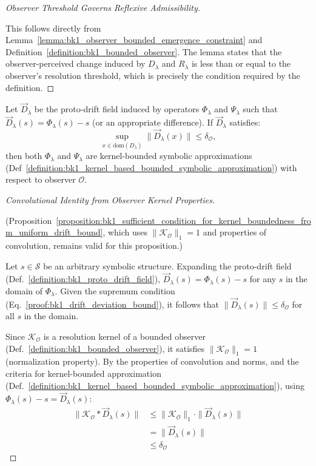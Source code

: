 \begin{proof}[Observer Threshold Governs Reflexive Admissibility]
\label{proof:bk1_observer_threshold_reflexivity}
\leavevmode

This follows directly from Lemma~\ref{lemma:bk1_observer_bounded_emergence_constraint} and Definition~\ref{definition:bk1_bounded_observer}. The lemma states that the observer-perceived change induced by $D_\lambda$ and $R_\lambda$ is less than or equal to the observer's resolution threshold, which is precisely the condition required by the definition.
\end{proof}
\begin{proposition} 
\label{proposition:bk1_sufficient_condition_for_kernel_boundedness_from_uniform_drift_bound}
Let $\vec{D}_\lambda$ be the proto-drift field induced by operators $\Phi_\lambda$ and $\Psi_\lambda$ such that $\vec{D}_\lambda(s) = \Phi_\lambda(s) - s$ (or an appropriate difference). If $\vec{D}_\lambda$ satisfies:
\begin{equation}
\sup_{x \in \mathrm{dom}(D_\lambda)} \|\vec{D}_\lambda(x)\| \leq \delta_\mathcal{O}, 
\end{equation}
then both $\Phi_\lambda$ and $\Psi_\lambda$ are kernel-bounded symbolic approximations (Def~\ref{definition:bk1_kernel_based_bounded_symbolic_approximation}) with respect to observer $\mathcal{O}$.
\begin{proof}[Convolutional Identity from Observer Kernel Properties]
\label{proof:bk1_observer_kernel_convolution}
\leavevmode

(Proposition~\ref{proposition:bk1_sufficient_condition_for_kernel_boundedness_from_uniform_drift_bound}, which uses $\|\mathcal{K}_\mathcal{O}\|_1 = 1$ and properties of convolution, remains valid for this proposition.)

Let $s \in \mathcal{S}$ be an arbitrary symbolic structure. Expanding the proto-drift field (Def.~\ref{definition:bk1_proto_drift_field}), $\vec{D}_\lambda(s) = \Phi_\lambda(s) - s$ for any $s$ in the domain of $\Phi_\lambda$. Given the supremum condition (Eq.~\ref{proof:bk1_drift_deviation_bound}), it follows that $\|\vec{D}_\lambda(s)\| \leq \delta_\mathcal{O}$ for all $s$ in the domain.

Since $\mathcal{K}_\mathcal{O}$ is a resolution kernel of a bounded observer (Def.~\ref{definition:bk1_bounded_observer}), it satisfies $\|\mathcal{K}_\mathcal{O}\|_1 = 1$ (normalization property). By the properties of convolution and norms, and the criteria for kernel-bounded approximation (Def.~\ref{definition:bk1_kernel_based_bounded_symbolic_approximation}), using $\Phi_\lambda(s) - s = \vec{D}_\lambda(s)$:
\begin{align}
\|\mathcal{K}_\mathcal{O} \ast \vec{D}_\lambda(s)\| &\leq \|\mathcal{K}_\mathcal{O}\|_1 \cdot \|\vec{D}_\lambda(s)\| \\
&= \|\vec{D}_\lambda(s)\| \\
&\leq \delta_\mathcal{O}
\end{align}


\end{proof}
\end{proposition}
